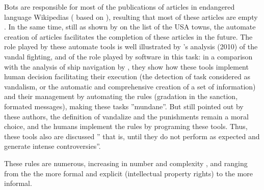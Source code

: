 
Bots are responsible for most of the publications of articles in endangered
language Wikipedias (\citealt[p. 12]{NiederervanDijck10} based on
\citealp{Rogersetal08}), resulting that most of these articles are
empty \citep{vanDijk09}. In the same time, still as shown by \citet{NiederervanDijck10}
on the list of the USA towns, the automate creation of articles facilitates
the completion of these articles in the future. The role played by
these automate tools is well illustrated by \citeauthor{GeigerRibes10}'s
analysis (2010) of the vandal fighting, and of the role played by
software in this task: in a comparison with the analysis of ship navigation
by \citet{Hutchins96}, they show how these tools implement human
decision facilitating their execution (the detection of task considered
as vandalism, or the automatic and comprehensive creation of a set
of information) and their management by automating the rules (gradation
in the sanction, formated messages), making these tasks ''mundane''.
But still pointed out by these authors, the definition of vandalize
and the punishments remain a moral choice, and the humans implement
the rules by programing these tools. Thus, these tools also are discussed
\citet[end of p. 5 and following]{Geiger11} ''\textendash{} that
is, until they do not perform as expected and generate intense controversies''.


These rules are numerous, increasing in number and complexity \citep[analyzing the English Wikipedia's rules]{Butleretal08},
and ranging from the the more formal and explicit (intellectual property
rights) to the more informal. 

